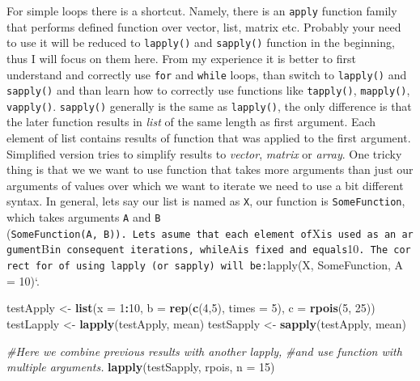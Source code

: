 \documentclass[]{book}
\newenvironment{Shaded}{\begin{snugshade}}{\end{snugshade}}
\newcommand{\KeywordTok}[1]{\textcolor[rgb]{0.13,0.29,0.53}{\textbf{#1}}}
\newcommand{\DataTypeTok}[1]{\textcolor[rgb]{0.13,0.29,0.53}{#1}}
\newcommand{\DecValTok}[1]{\textcolor[rgb]{0.00,0.00,0.81}{#1}}
\newcommand{\StringTok}[1]{\textcolor[rgb]{0.31,0.60,0.02}{#1}}
\newcommand{\CommentTok}[1]{\textcolor[rgb]{0.56,0.35,0.01}{\textit{#1}}}
\newcommand{\OperatorTok}[1]{\textcolor[rgb]{0.81,0.36,0.00}{\textbf{#1}}}
\newcommand{\NormalTok}[1]{#1}
\theoremstyle{definition}
\theoremstyle{definition}
\theoremstyle{definition}
\theoremstyle{remark}
\begin{document}
For simple loops there is a shortcut. Namely, there is an \texttt{apply}
function family that performs defined function over vector, list, matrix
etc. Probably your need to use it will be reduced to \texttt{lapply()}
and \texttt{sapply()} function in the beginning, thus I will focus on
them here. From my experience it is better to first understand and
correctly use \texttt{for} and \texttt{while} loops, than switch to
\texttt{lapply()} and \texttt{sapply()} and than learn how to correctly
use functions like \texttt{tapply()}, \texttt{mapply()},
\texttt{vapply()}. \texttt{sapply()} generally is the same as
\texttt{lapply()}, the only difference is that the later function
results in \emph{list} of the same length as first argument. Each
element of list contains results of function that was applied to the
first argument. Simplified version tries to simplify results to
\emph{vector}, \emph{matrix} or \emph{array}. One tricky thing is that
we we want to use function that takes more arguments than just our
arguments of values over which we want to iterate we need to use a bit
different syntax. In general, lets say our list is named as \texttt{X},
our function is \texttt{SomeFunction}, which takes arguments \texttt{A}
and \texttt{B}
(\texttt{SomeFunction(A,\ B)).\ Lets\ asume\ that\ each\ element\ of}X\texttt{is\ used\ as\ an\ argument}B\texttt{in\ consequent\ iterations,\ while}A\texttt{is\ fixed\ and\ equals}10\texttt{.\ The\ correct\ for\ of\ using\ lapply\ (or\ sapply)\ will\ be:}lapply(X,
SomeFunction, A = 10)`.

\begin{Shaded}
\begin{Highlighting}[]
\NormalTok{testApply  <-}\StringTok{ }\KeywordTok{list}\NormalTok{(}\DataTypeTok{x =} \DecValTok{1}\OperatorTok{:}\DecValTok{10}\NormalTok{, }\DataTypeTok{b =} \KeywordTok{rep}\NormalTok{(}\KeywordTok{c}\NormalTok{(}\DecValTok{4}\NormalTok{,}\DecValTok{5}\NormalTok{), }\DataTypeTok{times =} \DecValTok{5}\NormalTok{), }\DataTypeTok{c =} \KeywordTok{rpois}\NormalTok{(}\DecValTok{5}\NormalTok{, }\DecValTok{25}\NormalTok{))}
\NormalTok{testLapply <-}\StringTok{ }\KeywordTok{lapply}\NormalTok{(testApply, mean)}
\NormalTok{testSapply <-}\StringTok{ }\KeywordTok{sapply}\NormalTok{(testApply, mean)}

\CommentTok{#Here we combine previous results with another lapply,}
\CommentTok{#and use function with multiple arguments.}
\KeywordTok{lapply}\NormalTok{(testSapply, rpois, }\DataTypeTok{n =} \DecValTok{15}\NormalTok{)}
\end{Highlighting}
\end{Shaded}
\end{document}
